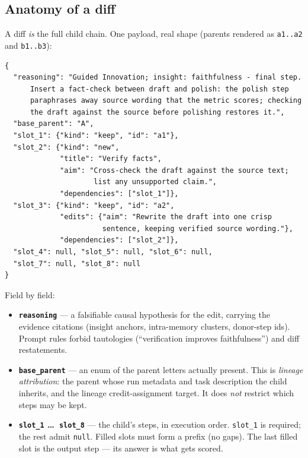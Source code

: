 \documentclass[11pt]{article}
\begin{document}
\subsection{Anatomy of a diff}
A diff \emph{is} the full child chain. One payload, real shape (parents rendered as
\texttt{a1..a2} and \texttt{b1..b3}):
\begin{lstlisting}
{
  "reasoning": "Guided Innovation; insight: faithfulness - final step.
      Insert a fact-check between draft and polish: the polish step
      paraphrases away source wording that the metric scores; checking
      the draft against the source before polishing restores it.",
  "base_parent": "A",
  "slot_1": {"kind": "keep", "id": "a1"},
  "slot_2": {"kind": "new",
             "title": "Verify facts",
             "aim": "Cross-check the draft against the source text;
                     list any unsupported claim.",
             "dependencies": ["slot_1"]},
  "slot_3": {"kind": "keep", "id": "a2",
             "edits": {"aim": "Rewrite the draft into one crisp
                       sentence, keeping verified source wording."},
             "dependencies": ["slot_2"]},
  "slot_4": null, "slot_5": null, "slot_6": null,
  "slot_7": null, "slot_8": null
}
\end{lstlisting}
Field by field:
\begin{itemize}
  \item \textbf{\texttt{reasoning}} --- a falsifiable causal hypothesis for the edit, carrying
  the evidence citations (insight anchors, intra-memory clusters, donor-step ids). Prompt
  rules forbid tautologies (``verification improves faithfulness'') and diff restatements.
  \item \textbf{\texttt{base\_parent}} --- an enum of the parent letters actually present.
  This is \emph{lineage attribution}: the parent whose run metadata and task description the
  child inherits, and the lineage credit-assignment target. It does \emph{not} restrict which
  steps may be kept.
  \item \textbf{\texttt{slot\_1} \dots\ \texttt{slot\_8}} --- the child's steps, in execution
  order. \texttt{slot\_1} is required; the rest admit \texttt{null}. Filled slots must form a
  prefix (no gaps). The last filled slot is the output step --- its answer is what gets
  scored.
\end{itemize}
\end{document}
